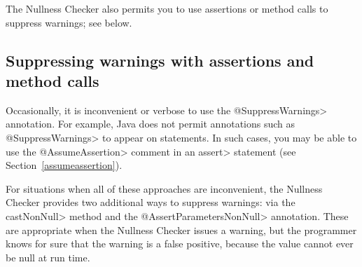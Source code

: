 The Nullness Checker also permits you to use assertions or method calls to
suppress warnings; see below.



\subsection{Suppressing warnings with assertions and method calls\label{suppressing-warnings-with-assertions}}

Occasionally, it is inconvenient or
verbose to use the \<@SuppressWarnings> annotation.  For example, Java does
not permit annotations such as \<@SuppressWarnings> to appear on statements.
In such cases, you may be able to use the \<@AssumeAssertion> comment in
an \<assert> statement (see Section~\ref{assumeassertion}).

For situations when all of these approaches are inconvenient,
the Nullness Checker provides two additional ways to suppress warnings:
via the \<castNonNull> method and the
\<@AssertParametersNonNull> annotation.  These are
appropriate when the Nullness Checker issues a warning, but the programmer
knows for sure that the warning is a false positive, because the value
cannot ever be null at run time.

